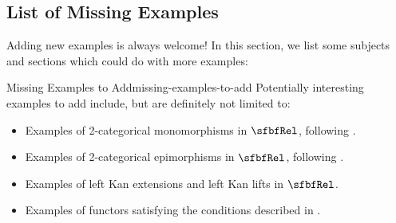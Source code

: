 \subsection{List of Missing Examples}\label{subsection-list-of-missing-examples}
Adding new examples is always welcome! In this section, we list some subjects and sections which could do with more examples:
\begin{remark}{Missing Examples to Add}{missing-examples-to-add}%
    Potentially interesting examples to add include, but are definitely not limited to:
    \begin{itemize}
        \item Examples of 2-categorical monomorphisms in $\sfbfRel$, following .
        \item Examples of 2-categorical epimorphisms in $\sfbfRel$, following .
        \item Examples of left Kan extensions and left Kan lifts in $\sfbfRel$.
        \item Examples of functors satisfying the conditions described in \ChapterCategories.
    \end{itemize}
\end{remark}
